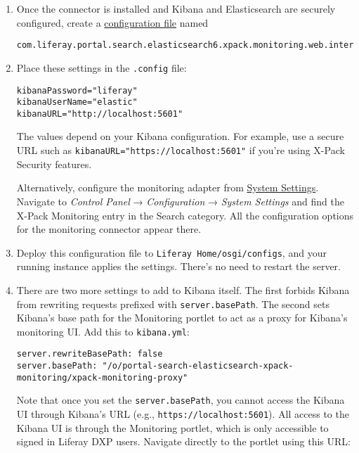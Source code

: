 \begin{enumerate}
\def\labelenumi{\arabic{enumi}.}
\item
  Once the connector is installed and Kibana and Elasticsearch are
  securely configured, create a
  \href{/docs/7-1/user/-/knowledge_base/u/understanding-system-configuration-files}{configuration
  file} named

\begin{verbatim}
com.liferay.portal.search.elasticsearch6.xpack.monitoring.web.internal.configuration.XPackMonitoringConfiguration.config
\end{verbatim}
\item
  Place these settings in the \texttt{.config} file:

\begin{verbatim}
kibanaPassword="liferay"
kibanaUserName="elastic"
kibanaURL="http://localhost:5601"
\end{verbatim}

  The values depend on your Kibana configuration. For example, use a
  secure URL such as \texttt{kibanaURL="https://localhost:5601"} if
  you're using X-Pack Security features.

  Alternatively, configure the monitoring adapter from
  \href{/docs/7-1/user/-/knowledge_base/u/system-settings}{System
  Settings}. Navigate to \emph{Control Panel} → \emph{Configuration} →
  \emph{System Settings} and find the X-Pack Monitoring entry in the
  Search category. All the configuration options for the monitoring
  connector appear there.
\item
  Deploy this configuration file to \texttt{Liferay\ Home/osgi/configs},
  and your running instance applies the settings. There's no need to
  restart the server.
\item
  There are two more settings to add to Kibana itself. The first forbids
  Kibana from rewriting requests prefixed with \texttt{server.basePath}.
  The second sets Kibana's base path for the Monitoring portlet to act
  as a proxy for Kibana's monitoring UI. Add this to
  \texttt{kibana.yml}:

\begin{verbatim}
server.rewriteBasePath: false
server.basePath: "/o/portal-search-elasticsearch-xpack-monitoring/xpack-monitoring-proxy"
\end{verbatim}

  Note that once you set the \texttt{server.basePath}, you cannot access
  the Kibana UI through Kibana's URL (e.g.,
  \texttt{https://localhost:5601}). All access to the Kibana UI is
  through the Monitoring portlet, which is only accessible to signed in
  Liferay DXP users. Navigate directly to the portlet using this URL:


\end{enumerate}
